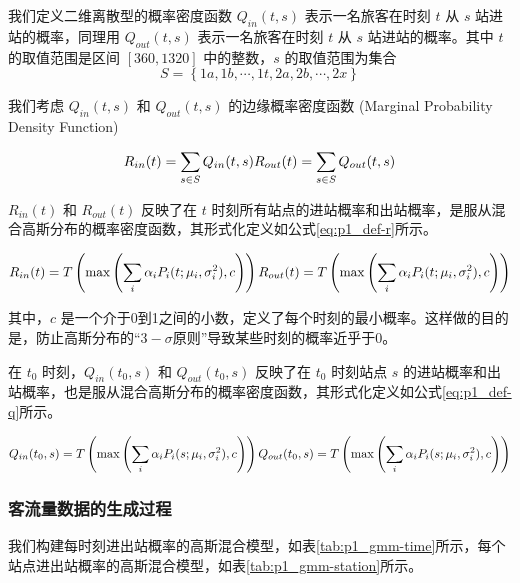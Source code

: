 \documentclass[12pt,a4paper]{mcmthesis}
\begin{document}
    我们定义二维离散型的概率密度函数 $Q_{in}(t,s)$ 表示一名旅客在时刻 $t$ 从 $s$ 站进站的概率，同理用 $Q_{out}(t,s)$ 表示一名旅客在时刻 $t$ 从 $s$ 站进站的概率。其中 $t$ 的取值范围是区间 $[360,1320]$ 中的整数，$s$ 的取值范围为集合
    \[ S = \left\{ 1a,1b,\cdots,1t,2a,2b,\cdots,2x \right\} \]

    我们考虑 $Q_{in}(t,s)$ 和 $Q_{out}(t,s)$ 的边缘概率密度函数 (Marginal Probability Density Function)

    \begin{equation*}
        R_{in}(t) = \sum_{s \in S} Q_{in}(t,s) \\
        R_{out}(t) = \sum_{s \in S} Q_{out}(t,s)
    \end{equation*}

    $R_{in}(t)$ 和 $R_{out}(t)$ 反映了在 $t$ 时刻所有站点的进站概率和出站概率，是服从混合高斯分布的概率密度函数，其形式化定义如公式\ref{eq:p1_def-r}所示。

    \begin{equation}
        R_{in}(t) = T \left( \max \left( \sum_i \alpha_i P_i(t;\mu_i,\sigma^2_i), c \right) \right) \\
        R_{out}(t) = T \left( \max \left( \sum_i \alpha_i P_i(t;\mu_i,\sigma^2_i), c \right) \right)
        \label{eq:p1_def-r}
    \end{equation}

    其中，$c$ 是一个介于0到1之间的小数，定义了每个时刻的最小概率。这样做的目的是，防止高斯分布的“$3-\sigma$原则”导致某些时刻的概率近乎于0。

    在 $t_0$ 时刻，$Q_{in}(t_0,s)$ 和 $Q_{out}(t_0,s)$ 反映了在 $t_0$ 时刻站点 $s$ 的进站概率和出站概率，也是服从混合高斯分布的概率密度函数，其形式化定义如公式\ref{eq:p1_def-q}所示。

    \begin{equation}
        Q_{in}(t_0,s) = T \left( \max \left( \sum_i \alpha_i P_i(s;\mu_i,\sigma^2_i), c \right) \right) \\
        Q_{out}(t_0,s) = T \left( \max \left( \sum_i \alpha_i P_i(s;\mu_i,\sigma^2_i), c \right) \right)
        \label{eq:p1_def-q}
    \end{equation}

    \subsubsection{客流量数据的生成过程}

    我们构建每时刻进出站概率的高斯混合模型，如表\ref{tab:p1_gmm-time}所示，每个站点进出站概率的高斯混合模型，如表\ref{tab:p1_gmm-station}所示。
\end{document}
